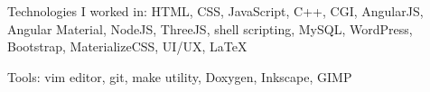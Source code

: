 \cventry{}
    {Technologies I worked in:}
    {}
    {HTML, CSS, JavaScript, C++, CGI, AngularJS, Angular Material, NodeJS, ThreeJS, shell scripting, MySQL, WordPress, Bootstrap, MaterializeCSS, UI/UX, LaTeX}
    {}
    {}

\cventry{}
    {Tools:}
    {}
    {vim editor, git, make utility, Doxygen, Inkscape, GIMP}
    {}
    {}
